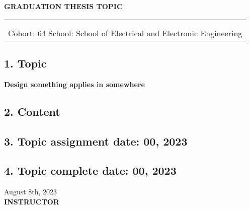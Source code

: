 \centerline{\textbf{\large GRADUATION THESIS TOPIC}}

\begin{table}[H]
    \centering
    \begin{tabular}{l r}
    \fontsize{14pt}{0pt}\selectfont {Full name of 1st student: Nguyen Van A}    & \fontsize{14pt}{0pt}\selectfont {Student ID: 2019xxxx}\\
    \fontsize{14pt}{0pt}\selectfont {Full name of 2nd student: Nguyen Thi B}    & \fontsize{14pt}{0pt}\selectfont {Student ID: 2019xxxx}\\
    \multicolumn{2}{c}{Cohort: 64 \hspace{2.5cm} School: School of Electrical and Electronic Engineering}
\end{tabular}
\end{table}
\subsection*{\textnormal{1. Topic}}
\textbf{Design something applies in somewhere}

\subsection*{\textnormal{2. Content}}

\subsection*{\textnormal{3. Topic assignment date: 00, 2023}}

\subsection*{\textnormal{4. Topic complete date: 00, 2023}}

\hspace{11cm} \textnormal{August 8th, 2023}\\
\hspace{11.1cm} \textbf{{INSTRUCTOR}}\\
\newpage